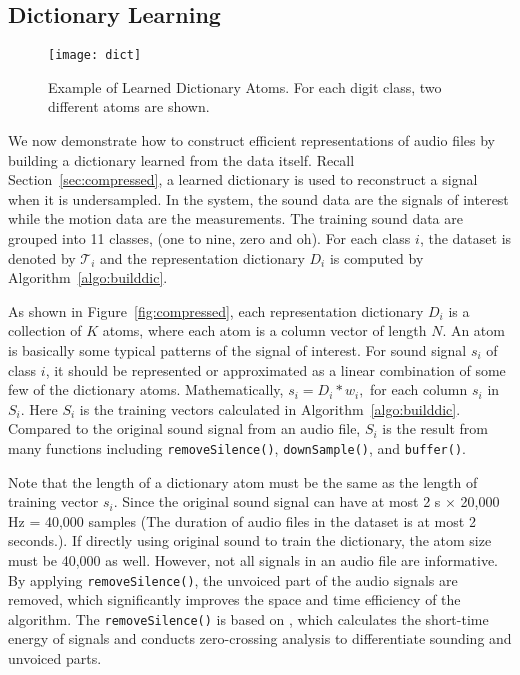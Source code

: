 \subsection{Dictionary Learning}\label{sec:design:dict}

\begin{figure*}[ht]
	\centering
	\texttt{[image: dict]}
	\caption{Example of Learned Dictionary Atoms. For each digit class, two different atoms are shown.}\label{fig:atoms}
\end{figure*}

We now demonstrate how to construct efficient representations of audio files by building a dictionary learned from the data itself. 
Recall Section~\ref{sec:compressed}, a learned dictionary is used to reconstruct a signal when it is undersampled. 
%
In the {\systemName} system, the sound data are the signals of interest while the motion data are the measurements. The training sound data are grouped into 11 classes, (one to nine, zero and oh). For each class $i$, the dataset is denoted by $\mathcal{T}_i$ and the representation dictionary $D_i$ is computed by Algorithm~\ref{algo:builddic}.

As shown in Figure~\ref{fig:compressed}, each representation dictionary $D_i$ is a collection of $K$ atoms, where each atom is a column vector of length $N$. An atom is basically some typical patterns of the signal of interest. For sound signal $s_i$ of class $i$,
it should be represented or approximated as a linear combination of some few of the dictionary atoms. Mathematically,
	$s_i = D_i * w_i,$
 for each column $s_i$ in $S_i$. Here $S_i$ is the training vectors calculated in Algorithm~\ref{algo:builddic}. Compared to the original sound signal from an audio file, $S_i$ is the result from many functions including \verb|removeSilence()|, \verb|downSample()|, and \verb|buffer()|. 
 


 
 
 Note that the length of a dictionary atom must be the same as the length of training vector $s_i$. Since the original sound signal can have at most 2 s $\times$ 20,000 Hz = 40,000 samples (The duration of audio files in the dataset is at most 2 seconds.). If directly using original sound to train the dictionary, the atom size must be 40,000 as well. However, not all signals in an audio file are informative. By applying \verb|removeSilence()|, the unvoiced part of the audio signals are removed, which significantly improves the space and time efficiency of the algorithm. The \verb|removeSilence()| is  based on \cite{rabiner2011theory}, which calculates the short-time energy of signals and conducts zero-crossing analysis to differentiate  sounding and unvoiced parts.
 
